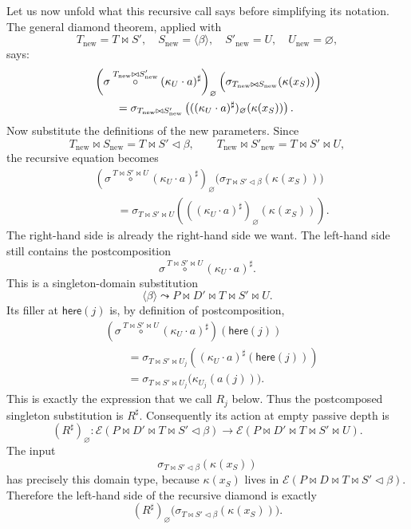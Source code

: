 \documentclass[11pt]{article}
\newcommand{\E}{\mathcal E}
\newcommand{\ext}{\mathbin{\triangleleft}}
\newcommand{\pcomp}[3]{#1 \overset{#2}{\circ} #3}
\begin{document}
Let us now unfold what this recursive call says before simplifying its
notation.  The general diamond theorem, applied with
\[
  T_{\mathrm{new}}=T\bowtie S',
  \quad
  S_{\mathrm{new}}=\langle\beta\rangle,
  \quad
  S'_{\mathrm{new}}=U,
  \quad
  U_{\mathrm{new}}=\varnothing,
\]
says:
\[
\begin{aligned}
&
  \left(
    \pcomp{\sigma}{T_{\mathrm{new}}\bowtie S'_{\mathrm{new}}}
      {(\kappa_U \cdot a)^\sharp}
  \right)_{\varnothing}
  \Bigl(
    \sigma_{T_{\mathrm{new}}\bowtie S_{\mathrm{new}}}
      (\kappa(x_S))
  \Bigr)
\\
&\qquad =
  \sigma_{T_{\mathrm{new}}\bowtie S'_{\mathrm{new}}}
  \left(
    ((\kappa_U \cdot a)^\sharp)_{\varnothing}(\kappa(x_S))
  \right).
\end{aligned}
\]
Now substitute the definitions of the new parameters.  Since
\[
  T_{\mathrm{new}}\bowtie S_{\mathrm{new}}
  =
  T \bowtie S' \ext \beta,
  \qquad
  T_{\mathrm{new}}\bowtie S'_{\mathrm{new}}
  =
  T \bowtie S' \bowtie U,
\]
the recursive equation becomes
\[
\begin{aligned}
&
  \left(
    \pcomp{\sigma}{T \bowtie S' \bowtie U}
      {(\kappa_U \cdot a)^\sharp}
  \right)_{\varnothing}
  \bigl(
    \sigma_{T \bowtie S' \ext \beta}(\kappa(x_S))
  \bigr)
\\
&\qquad =
  \sigma_{T \bowtie S' \bowtie U}
  \left(
    ((\kappa_U \cdot a)^\sharp)_\varnothing(\kappa(x_S))
  \right).
\end{aligned}
\]
The right-hand side is already the right-hand side we want.  The left-hand side
still contains the postcomposition
\[
  \pcomp{\sigma}{T \bowtie S' \bowtie U}{(\kappa_U \cdot a)^\sharp}.
\]
This is a singleton-domain substitution
\[
  \langle\beta\rangle
  \leadsto
  P \bowtie D' \bowtie T \bowtie S' \bowtie U.
\]
Its filler at \(\mathsf{here}(j)\) is, by definition of postcomposition,
\[
\begin{aligned}
&
  \left(
    \pcomp{\sigma}{T \bowtie S' \bowtie U}
      {(\kappa_U \cdot a)^\sharp}
  \right)(\mathsf{here}(j))
\\
&\qquad =
  \sigma_{T \bowtie S' \bowtie U_j}
  \left(
    (\kappa_U \cdot a)^\sharp(\mathsf{here}(j))
  \right)
\\
&\qquad =
  \sigma_{T \bowtie S' \bowtie U_j}
  \bigl(\kappa_{U_j}(a(j))\bigr).
\end{aligned}
\]
This is exactly the expression that we call \(R_j\) below.  Thus the
postcomposed singleton substitution is \(R^\sharp\).  Consequently its action
at empty passive depth is
\[
  (R^\sharp)_\varnothing :
  \E(P \bowtie D' \bowtie T \bowtie S' \ext \beta)
  \to
  \E(P \bowtie D' \bowtie T \bowtie S' \bowtie U).
\]
The input
\[
  \sigma_{T \bowtie S' \ext \beta}(\kappa(x_S))
\]
has precisely this domain type, because \(\kappa(x_S)\) lives in
\(\E(P \bowtie D \bowtie T \bowtie S' \ext \beta)\).  Therefore the left-hand
side of the recursive diamond is exactly
\[
  (R^\sharp)_\varnothing
  \bigl(\sigma_{T \bowtie S' \ext \beta}(\kappa(x_S))\bigr).
\]
\end{document}
